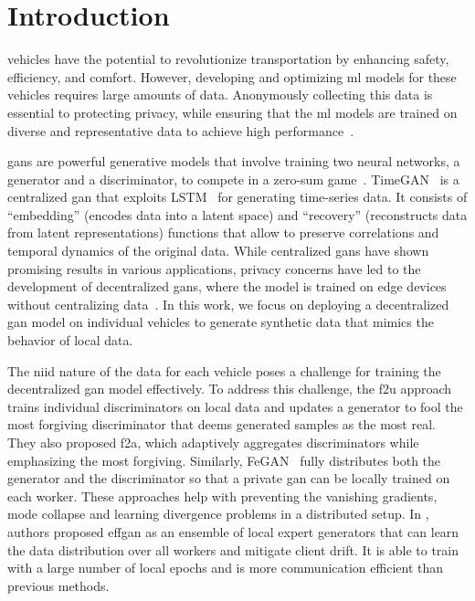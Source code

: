\section{Introduction}

 vehicles have the potential to revolutionize transportation by enhancing safety, efficiency, and comfort. However, developing and optimizing \gls*{ml} models for these vehicles requires large amounts of data. Anonymously collecting this data is essential to protecting privacy, while ensuring that the \gls*{ml} models are trained on diverse and representative data to achieve high performance~\cite{comm-efficient}.

\glspl*{gan} are powerful generative models that involve training two neural networks, a generator and a discriminator, to compete in a zero-sum game~\cite{goodfellow_generative_2014}. TimeGAN~\cite{yoon_time-series_2019} is a centralized \gls*{gan} that exploits LSTM~\cite{hochreiter_long_1997} for generating time-series data. It consists of ``embedding'' (encodes data into a latent space) and ``recovery'' (reconstructs data from latent representations) functions that allow to preserve correlations and temporal dynamics of the original data. While centralized \glspl*{gan} have shown promising results in various applications, privacy concerns have led to the development of decentralized \glspl*{gan}, where the model is trained on edge devices without centralizing data~\cite{hardy_md-gan_2019}. In this work, we focus on deploying a decentralized \gls*{gan} model on individual vehicles to generate synthetic data that mimics the behavior of local data.

The \gls*{niid} nature of the data for each vehicle poses a challenge for training the decentralized \gls*{gan} model effectively. To address this challenge, the \gls*{f2u} approach ~\cite{yonetani_decentralized_2019} trains individual discriminators on local data and updates a generator to fool the most forgiving discriminator that deems generated samples as the most real. They also proposed \gls*{f2a}, which adaptively aggregates discriminators while emphasizing the most forgiving. Similarly, FeGAN~\cite{guerraoui_fegan_2020} fully distributes both the generator and the discriminator so that a private \gls*{gan} can be locally trained on each worker. These approaches help with preventing the vanishing gradients, mode collapse and learning divergence problems in a distributed setup.
%
In \cite{ekblom_effgan_2022}, %
authors proposed \gls*{effgan} as an ensemble of local expert generators that can learn the data distribution over all workers and mitigate client drift. It is able to train with a large number of local epochs and is more communication efficient than previous methods.

